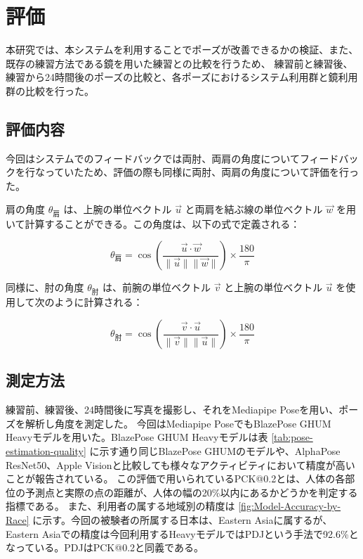 \chapter{評価}

\label{evaluation}
本研究では、本システムを利用することでポーズが改善できるかの検証、また、既存の練習方法である鏡を用いた練習との比較を行うため、
練習前と練習後、練習から24時間後のポーズの比較と、各ポーズにおけるシステム利用群と鏡利用群の比較を行った。
\section{評価内容}
  今回はシステムでのフィードバックでは両肘、両肩の角度についてフィードバックを行なっていたため、評価の際も同様に両肘、両肩の角度について評価を行った。


  肩の角度 \(\theta_{\text{肩}}\) は、上腕の単位ベクトル \(\vec{u}\) と両肩を結ぶ線の単位ベクトル \(\vec{w}\) を用いて計算することができる。この角度は、以下の式で定義される：

  \[
  \theta_{\text{肩}} = \cos\left( \frac{\vec{u} \cdot \vec{w}}{\|\vec{u}\| \|\vec{w}\|} \right) \times \frac{180}{\pi}
  \]


  同様に、肘の角度 \(\theta_{\text{肘}}\) は、前腕の単位ベクトル \(\vec{v}\) と上腕の単位ベクトル \(\vec{u}\) を使用して次のように計算される：

  \[
  \theta_{\text{肘}} = \cos\left( \frac{\vec{v} \cdot \vec{u}}{\|\vec{v}\| \|\vec{u}\|} \right) \times \frac{180}{\pi}
  \]

\section{測定方法}
  練習前、練習後、24時間後に写真を撮影し、それをMediapipe Poseを用い、ポーズを解析し角度を測定した。
  今回はMediapipe PoseでもBlazePose GHUM Heavyモデルを用いた。BlazePose GHUM Heavyモデルは表 \ref{tab:pose-estimation-quality} に示す通り同じBlazePose GHUMのモデルや、AlphaPose ResNet50、Apple Visionと比較しても様々なアクティビティにおいて精度が高いことが報告されている。
  この評価で用いられているPCK@0.2とは、人体の各部位の予測点と実際の点の距離が、人体の幅の20\%以内にあるかどうかを判定する指標である。\cite{PCK} また、利用者の属する地域別の精度は \ref{fig:Model-Accuracy-by-Race} に示す。今回の被験者の所属する日本は、Eastern Asiaに属するが、Eastern Asiaでの精度は今回利用するHeavyモデルではPDJという手法で92.6\%となっている。PDJはPCK@0.2と同義である。

